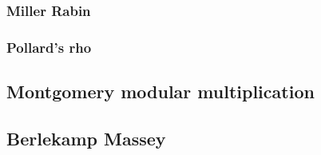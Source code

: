 \subsubsection{Miller Rabin}

\subsubsection{Pollard's rho}


\subsection{Montgomery modular multiplication}


\subsection{Berlekamp Massey}

